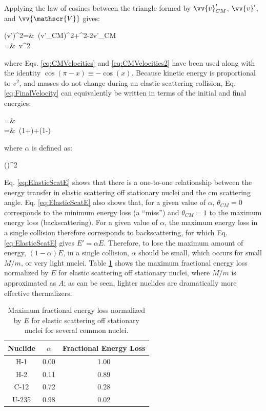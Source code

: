 Applying the law of cosines between the triangle formed by \(\vv{v}_{CM}'\), \(\vv{v}'\), and \(\vv{\mathscr{V}}\) gives:

\beqa
\label{eq:FinalVelocity}
(v')^2=&\ (v'_{CM})^2+^2-2v'_{CM}\\
=&\ v^2\\
\eeqa

where Eqs. \eqref{eq:CMVelocities} and \eqref{eq:CMVelocities2} have been used along with the identity \(\cos{(\pi-x)}\equiv-\cos{(x)}\). Because kinetic energy is proportional to \(v^2\), and masses do not change during an elastic scattering collision, Eq. \eqref{eq:FinalVelocity} can equivalently be written in terms of the initial and final energies:

\beqa
\label{eq:ElasticScatE}
=&\ \\
=&\ \left\lbrack(1+\alpha)+(1-\alpha)\right\rbrack\\
\eeqa

where \(\alpha\) is defined as:

\beq
\alpha\equiv\left(\right)^2
\eeq

Eq. \eqref{eq:ElasticScatE} shows that there is a one-to-one relationship between the energy transfer in elastic scattering off stationary nuclei and the \gls{cm} scattering angle. Eq. \eqref{eq:ElasticScatE} also shows that, for a given value of \(\alpha\), \(\theta_{CM}=0\) corresponds to the minimum energy loss (a ``miss'') and \(\theta_{CM}=1\) to the maximum energy loss (backscattering). For a given value of \(\alpha\), the maximum energy loss in a single collision therefore corresponds to backscattering, for which Eq. \eqref{eq:ElasticScatE} gives \(E'=\alpha E\). Therefore, to lose the maximum amount of energy, \((1-\alpha)E\), in a single collision, \(\alpha\) should be small, which occurs for small \(M/m\), or very light nuclei. Table \ref{table:FractionalEnergyLoss} shows the maximum fractional energy loss normalized by \(E\) for elastic scattering off stationary nuclei, where \(M/m\) is approximated as \(A\); as can be seen, lighter nuclides are dramatically more effective thermalizers.

\begin{table}[H]
\caption{Maximum fractional energy loss normalized by \(E\) for elastic scattering off stationary nuclei for several common nuclei.}
\centering
\begin{tabular}{c c c}
\hline\hline
Nuclide & \(\alpha\) & Fractional Energy Loss\\ [0.5ex]
\hline
H-1 & 0.00 & 1.00\\
H-2 & 0.11 & 0.89\\
C-12 & 0.72 & 0.28\\
U-235 & 0.98 & 0.02\\
\hline
\end{tabular}
\label{table:FractionalEnergyLoss}
\end{table}

